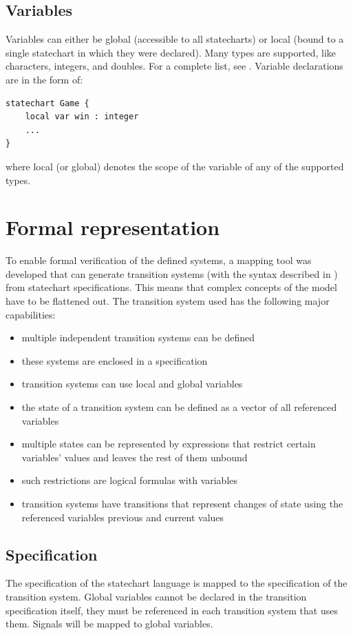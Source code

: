   \subsection{Variables}
Variables can either be global (accessible to all statecharts) or local (bound to a single statechart in which they were declared). Many types are supported, like characters, integers, and doubles. For a complete list, see \citep{fapts}. Variable declarations are in the form of:

\begin{lstlisting}
statechart Game {
	local var win : integer
	...
}
\end{lstlisting}

where local (or global) denotes the scope of the variable of any of the supported types.
\section{Formal representation}
To enable formal verification of the defined systems, a mapping tool was developed that can generate transition systems (with the syntax described in \citep{fapts}) from statechart specifications. This means that complex concepts of the model have to be flattened out. The transition system used has the following major capabilities:
\begin{itemize}
  \item multiple independent transition systems can be defined
  \item these systems are enclosed in a specification
  \item transition systems can use local and global variables
  \item the state of a transition system can be defined as a vector of all referenced variables
  \item multiple states can be represented by expressions that restrict certain variables' values and leaves the rest of them unbound
  \item such restrictions are logical formulas with variables
  \item transition systems have transitions that represent changes of state using the referenced variables previous and current values
\end{itemize}
  \subsection{Specification}
The specification of the statechart language is mapped to the specification of the transition system. Global variables cannot be declared in the transition specification itself, they must be referenced in each transition system that uses them. Signals will be mapped to global variables.
